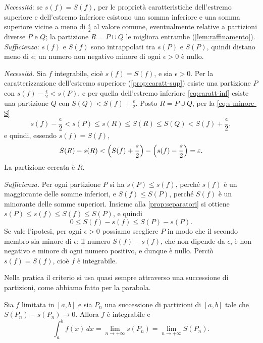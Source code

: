 \begin{schema}
\end{schema}

\begin{strategia}
\emph{Necessità}: se $s(f)=S(f)$, per le proprietà caratteristiche dell'estremo superiore
e dell'estremo inferiore esistono una somma inferiore e una somma superiore vicine a
meno di $\frac\epsilon2$ al valore comune, eventualmente relative a partizioni diverse
$P$ e $Q$; la partizione $R=P\cup Q$ le migliora entrambe (\cref{lem:raffinamento}).
\emph{Sufficienza}: $s(f)$ e $S(f)$ sono intrappolati tra $s(P)$ e $S(P)$, quindi distano
meno di $\epsilon$; un numero non negativo minore di ogni $\epsilon>0$ è nullo.
\end{strategia}

\begin{dimostrazione}
\emph{Necessità.} Sia $f$ integrabile, cioè $s(f)=S(f)$, e sia $\epsilon>0$. Per la
caratterizzazione dell'estremo superiore (\cref{prop:caratt-sup}) esiste una partizione
$P$ con $s(f)-\frac\epsilon2<s(P)$, e per quella dell'estremo inferiore
\eqref{eq:caratt-inf} esiste una partizione $Q$ con $S(Q)<S(f)+\frac\epsilon2$. Posto
$R=P\cup Q$, per la \eqref{eq:s-minore-S}
\[
  s(f)-\frac\epsilon2<s(P)\le s(R)\le S(R)\le S(Q)<S(f)+\frac\epsilon2 ,
\]
e quindi, essendo $s(f)=S(f)$,
\[
  S(R)-s(R)<\Bigl(S(f)+\frac\epsilon2\Bigr)-\Bigl(s(f)-\frac\epsilon2\Bigr)=\epsilon .
\]
La partizione cercata è $R$.

\emph{Sufficienza.} Per ogni partizione $P$ si ha $s(P)\le s(f)$, perché $s(f)$ è un
maggiorante delle somme inferiori, e $S(f)\le S(P)$, perché $S(f)$ è un minorante delle
somme superiori. Insieme alla \cref{prop:separatori} si ottiene
$s(P)\le s(f)\le S(f)\le S(P)$, e quindi
\[
  0\le S(f)-s(f)\le S(P)-s(P) .
\]
Se vale l'ipotesi, per ogni $\epsilon>0$ possiamo scegliere $P$ in modo che il secondo
membro sia minore di $\epsilon$: il numero $S(f)-s(f)$, che non dipende da $\epsilon$, è
non negativo e minore di ogni numero positivo, e dunque è nullo. Perciò $s(f)=S(f)$, cioè
$f$ è integrabile.
\end{dimostrazione}

Nella pratica il criterio si usa quasi sempre attraverso una successione di partizioni,
come abbiamo fatto per la parabola.

\begin{corollario}\label{cor:limite-somme}
Sia $f$ limitata in $[a,b]$ e sia $P_{n}$ una successione di partizioni di $[a,b]$ tale
che $S(P_{n})-s(P_{n})\to0$. Allora $f$ è integrabile e
\begin{equation}\label{eq:limite-somme}
  \int_{a}^{b}f(x)\,dx=\lim_{n\to+\infty}s(P_{n})=\lim_{n\to+\infty}S(P_{n}) .
\end{equation}
\end{corollario}

